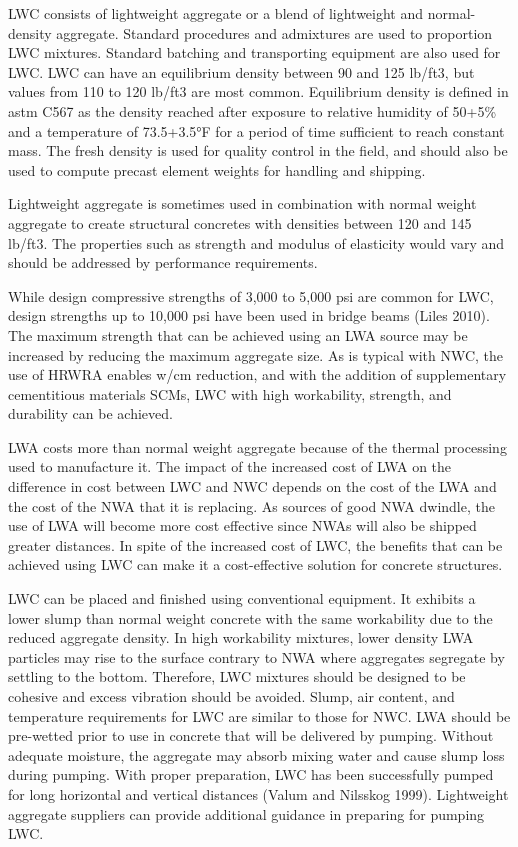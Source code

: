 LWC consists of lightweight aggregate or a blend of lightweight and normal-density aggregate. Standard
procedures and admixtures are used to proportion LWC mixtures. Standard batching and transporting equipment are
also used for LWC. LWC can have an equilibrium density between 90 and 125 lb/ft3, but values from 110 to 120
lb/ft3 are most common. Equilibrium density is defined in \acrshort*{astm} C567 as the density reached after exposure to
relative humidity of 50+5\% and a temperature of 73.5+3.5°F for a period of time sufficient to reach constant mass.
The fresh density is used for quality control in the field, and should also be used to compute precast element weights
for handling and shipping.

Lightweight aggregate is sometimes used in combination with normal weight aggregate to create structural
concretes with densities between 120 and 145 lb/ft3. The properties such as strength and modulus of elasticity would
vary and should be addressed by performance requirements.

While design compressive strengths of 3,000 to 5,000 psi are common for LWC, design strengths up to 10,000
psi have been used in bridge beams (Liles 2010). The maximum strength that can be achieved using an LWA source may be increased by reducing the maximum aggregate size. As is typical with NWC, the use of HRWRA enables
w/cm reduction, and with the addition of supplementary cementitious materials SCMs, LWC with high workability,
strength, and durability can be achieved.

LWA costs more than normal weight aggregate because of the thermal processing used to manufacture it. The
impact of the increased cost of LWA on the difference in cost between LWC and NWC depends on the cost of the
LWA and the cost of the NWA that it is replacing. As sources of good NWA dwindle, the use of LWA will become
more cost effective since NWAs will also be shipped greater distances. In spite of the increased cost of LWC, the
benefits that can be achieved using LWC can make it a cost-effective solution for concrete structures.

LWC can be placed and finished using conventional equipment. It exhibits a lower slump than normal weight
concrete with the same workability due to the reduced aggregate density. In high workability mixtures, lower density
LWA particles may rise to the surface contrary to NWA where aggregates segregate by settling to the bottom.
Therefore, LWC mixtures should be designed to be cohesive and excess vibration should be avoided. Slump, air
content, and temperature requirements for LWC are similar to those for NWC. LWA should be pre-wetted prior to
use in concrete that will be delivered by pumping. Without adequate moisture, the aggregate may absorb mixing
water and cause slump loss during pumping. With proper preparation, LWC has been successfully pumped for long
horizontal and vertical distances (Valum and Nilsskog 1999). Lightweight aggregate suppliers can provide additional
guidance in preparing for pumping LWC.

